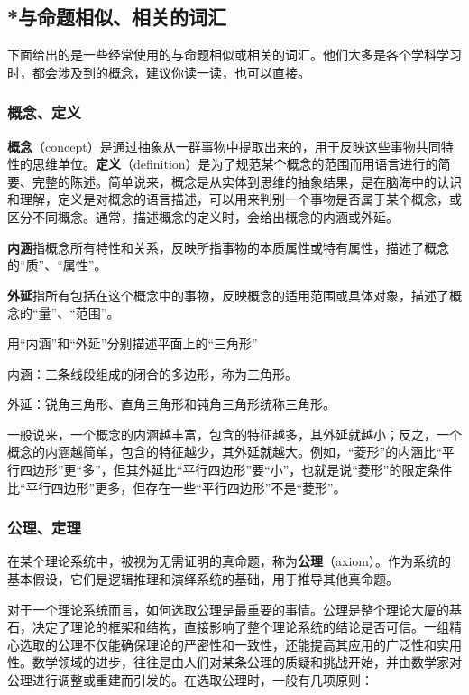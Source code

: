 \subsection{*与命题相似、相关的词汇}

下面给出的是一些经常使用的与命题相似或相关的词汇。他们大多是各个学科学习时，都会涉及到的概念，建议你读一读，也可以直接。

\subsubsection{概念、定义}

\textbf{概念}（concept）是通过抽象从一群事物中提取出来的，用于反映这些事物共同特性的思维单位。\textbf{定义}（definition）是为了规范某个概念的范围而用语言进行的简要、完整的陈述。简单说来，概念是从实体到思维的抽象结果，是在脑海中的认识和理解，定义是对概念的语言描述，可以用来判别一个事物是否属于某个概念，或区分不同概念。通常，描述概念的定义时，会给出概念的内涵或外延。

\textbf{内涵}指概念所有特性和关系，反映所指事物的本质属性或特有属性，描述了概念的“质”、“属性”。

\textbf{外延}指所有包括在这个概念中的事物，反映概念的适用范围或具体对象，描述了概念的“量”、“范围”。

\begin{example}{用“内涵”和“外延”分别描述平面上的“三角形”}

内涵：三条线段组成的闭合的多边形，称为三角形。

外延：锐角三角形、直角三角形和钝角三角形统称三角形。

\end{example}

一般说来，一个概念的内涵越丰富，包含的特征越多，其外延就越小；反之，一个概念的内涵越简单，包含的特征越少，其外延就越大。例如，“菱形”的内涵比“平行四边形”更“多”，但其外延比“平行四边形”要“小”，也就是说“菱形”的限定条件比“平行四边形”更多，但存在一些“平行四边形”不是“菱形”。

\subsubsection{公理、定理}

在某个理论系统中，被视为无需证明的真命题，称为\textbf{公理}（axiom）。作为系统的基本假设，它们是逻辑推理和演绎系统的基础，用于推导其他真命题。

对于一个理论系统而言，如何选取公理是最重要的事情。公理是整个理论大厦的基石，决定了理论的框架和结构，直接影响了整个理论系统的结论是否可信。一组精心选取的公理不仅能确保理论的严密性和一致性，还能提高其应用的广泛性和实用性。数学领域的进步，往往是由人们对某条公理的质疑和挑战开始，并由数学家对公理进行调整或重建而引发的。在选取公理时，一般有几项原则：

